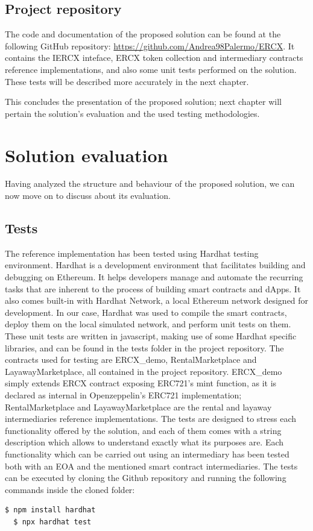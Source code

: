 \documentclass[english, LaM, oneside]{sapthesis}%
\begin{document}
\section{Project repository}
The code and documentation of the proposed solution can be found at the following GitHub repository: \url{https://github.com/Andrea98Palermo/ERCX}. It contains the IERCX inteface,  ERCX token collection and intermediary contracts reference implementations, and also some unit tests performed on the solution. These tests will be described more accurately in the next chapter.

\bigskip
\bigskip
This concludes the presentation of the proposed solution; next chapter will pertain the solution's evaluation and the used testing methodologies.


\chapter{Solution evaluation}
\label{chap:3}
Having analyzed the structure and behaviour of the proposed solution, we can now move on to discuss about its evaluation.

\section{Tests}
The reference implementation has been tested using Hardhat\cite{ref:hardhat} testing environment. Hardhat is a development environment that facilitates building and debugging on Ethereum. It helps developers manage and automate the recurring tasks that are inherent to the process of building smart contracts and dApps. It also comes built-in with Hardhat Network, a local Ethereum network designed for development. \newline
In our case, Hardhat was used to compile the smart contracts, deploy them on the local simulated network, and perform unit tests on them. These unit tests are written in javascript, making use of some Hardhat specific libraries, and can be found in the tests folder in the project repository. \newline
The contracts used for testing are ERCX\_demo, RentalMarketplace and LayawayMarketplace, all contained in the project repository. ERCX\_demo simply extends ERCX contract exposing ERC721's mint function, as it is declared as internal in Openzeppelin's ERC721 implementation; RentalMarketplace and LayawayMarketplace are the rental and layaway intermediaries reference implementations.\newline
The tests are designed to stress each functionality offered by the solution, and each of them comes with a string description which allows to understand exactly what its purposes are. Each functionality which can be carried out using an intermediary has been tested both with an EOA and the mentioned smart contract intermediaries. \newline
The tests can be executed by cloning the Github repository and running the following commands inside the cloned folder:
\begin{lstlisting}[language=bash]
  $ npm install hardhat  
  $ npx hardhat test
\end{lstlisting}
\end{document}
